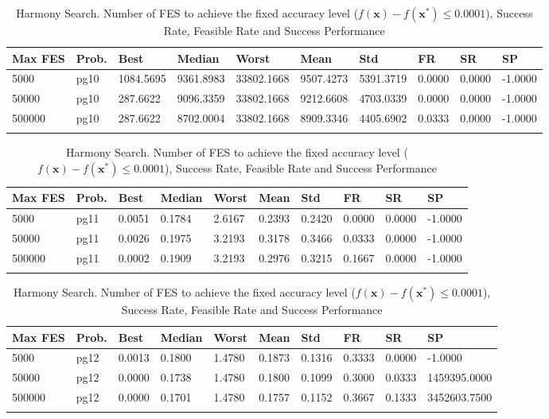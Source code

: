 \documentclass[10pt, a4paper]{book}
\begin{document}
\begin{center}
\begin{longtable}{l l l l l l l l l l}
\textbf{Max FES} & \textbf{Prob.} & \textbf{Best} & \textbf{Median} & \textbf{Worst} & \textbf{Mean} & \textbf{Std} & \textbf{FR} & \textbf{SR} & \textbf{SP} \\
\hline
5000 & pg10 & 1084.5695 & 9361.8983 & 33802.1668 & 9507.4273 & 5391.3719 & 0.0000 & 0.0000 & -1.0000 \\
50000 & pg10 & 287.6622 & 9096.3359 & 33802.1668 & 9212.6608 & 4703.0339 & 0.0000 & 0.0000 & -1.0000 \\
500000 & pg10 & 287.6622 & 8702.0004 & 33802.1668 & 8909.3346 & 4405.6902 & 0.0333 & 0.0000 & -1.0000 \\

\caption{ Harmony Search. Number of FES to achieve the fixed accuracy level ($f(\mathbf{x}) - f(\mathbf{x}^{*}) \leq 0.0001$), Success Rate, Feasible Rate and Success Performance }
\end{longtable}
\end{center}

\begin{center}
\begin{longtable}{l l l l l l l l l l}
\textbf{Max FES} & \textbf{Prob.} & \textbf{Best} & \textbf{Median} & \textbf{Worst} & \textbf{Mean} & \textbf{Std} & \textbf{FR} & \textbf{SR} & \textbf{SP} \\
\hline
5000 & pg11 & 0.0051 & 0.1784 & 2.6167 & 0.2393 & 0.2420 & 0.0000 & 0.0000 & -1.0000 \\
50000 & pg11 & 0.0026 & 0.1975 & 3.2193 & 0.3178 & 0.3466 & 0.0333 & 0.0000 & -1.0000 \\
500000 & pg11 & 0.0002 & 0.1909 & 3.2193 & 0.2976 & 0.3215 & 0.1667 & 0.0000 & -1.0000 \\

\caption{ Harmony Search. Number of FES to achieve the fixed accuracy level ($f(\mathbf{x}) - f(\mathbf{x}^{*}) \leq 0.0001$), Success Rate, Feasible Rate and Success Performance }
\end{longtable}
\end{center}

\begin{center}
\begin{longtable}{l l l l l l l l l l}
\textbf{Max FES} & \textbf{Prob.} & \textbf{Best} & \textbf{Median} & \textbf{Worst} & \textbf{Mean} & \textbf{Std} & \textbf{FR} & \textbf{SR} & \textbf{SP} \\
\hline
5000 & pg12 & 0.0013 & 0.1800 & 1.4780 & 0.1873 & 0.1316 & 0.3333 & 0.0000 & -1.0000 \\
50000 & pg12 & 0.0000 & 0.1738 & 1.4780 & 0.1800 & 0.1099 & 0.3000 & 0.0333 & 1459395.0000 \\
500000 & pg12 & 0.0000 & 0.1701 & 1.4780 & 0.1757 & 0.1152 & 0.3667 & 0.1333 & 3452603.7500 \\

\caption{ Harmony Search. Number of FES to achieve the fixed accuracy level ($f(\mathbf{x}) - f(\mathbf{x}^{*}) \leq 0.0001$), Success Rate, Feasible Rate and Success Performance }
\end{longtable}
\end{center}
\end{document}
